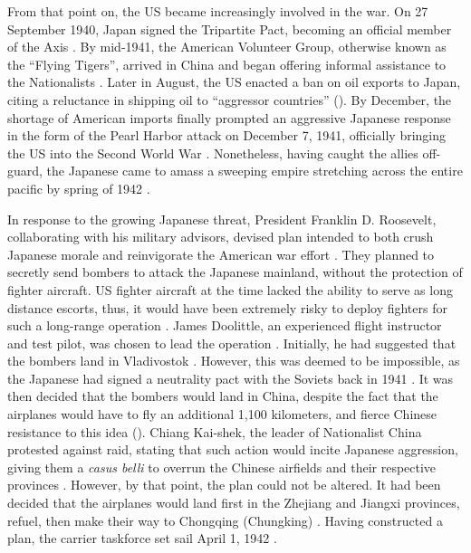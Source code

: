 From that point on, the US became increasingly involved in the war. On 27 September 1940, Japan signed the Tripartite Pact, becoming an official member of the Axis \autocite{Britannica2023TripartitePact}. By mid-1941, the American Volunteer Group, otherwise known as the “Flying Tigers”, arrived in China and began offering informal assistance to the Nationalists \autocite{Doubek2021FlyingTigersNPR}. Later in August, the US enacted a ban on oil exports to Japan, citing a reluctance in shipping oil to “aggressor countries” (\cites[p.\ 74]{Feis1950RoadToPearlHarbor}{Roosevelt1941FreezingJapaneseAssets}). By December, the shortage of American imports finally prompted an aggressive Japanese response in the form of the Pearl Harbor attack on December 7, 1941, officially bringing the US into the Second World War \autocite{TAMUCC2024PearlHarborMotives}. Nonetheless, having caught the allies off-guard, the Japanese came to amass a sweeping empire stretching across the entire pacific by spring of 1942 \autocite{WWIIMuseum2019PacificStrategy}.

In response to the growing Japanese threat, President Franklin D. Roosevelt, collaborating with his military advisors, devised plan intended to both crush Japanese morale and reinvigorate the American war effort \autocite[p.\ 10]{Glines1988DoolittleRaid}. They planned to secretly send bombers to attack the Japanese mainland, without the protection of fighter aircraft. US fighter aircraft at the time lacked the ability to serve as long distance escorts, thus, it would have been extremely risky to deploy fighters for such a long-range operation \autocite{RogersNDInnovationDoolittleBlackMonday}. James Doolittle, an experienced flight instructor and test pilot, was chosen to lead the operation \autocite{Britannica2024JamesHDoolittle}. Initially, he had suggested that the bombers land in Vladivostok \autocite[p.\ 27]{Glines1988DoolittleRaid}. However, this was deemed to be impossible, as the Japanese had signed a neutrality pact with the Soviets back in 1941 \autocite{MolotovMatsuokaTatekawa1941NeutralityPactText}. It was then decided that the bombers would land in China, despite the fact that the airplanes would have to fly an additional 1,100 kilometers, and fierce Chinese resistance to this idea (\cites{Britannica2024DoolittleRaid}[p.\ 32]{Chun2006DoolittleRaid}[p.\ 27]{Glines1988DoolittleRaid}). Chiang Kai-shek, the leader of Nationalist China protested against raid, stating that such action would incite Japanese aggression, giving them a \emph{casus belli} to overrun the Chinese airfields and their respective provinces \autocite[p.\ 209]{Taylor2009Generalissimo}. However, by that point, the plan could not be altered. It had been decided that the airplanes would land first in the Zhejiang and Jiangxi provinces, refuel, then make their way to Chongqing (Chungking) \autocite[p.\ 32]{Chun2006DoolittleRaid}. Having constructed a plan, the carrier taskforce set sail April 1, 1942 \autocite[p.\ 440]{CravenCate1948AAFWW2Vol1}.


